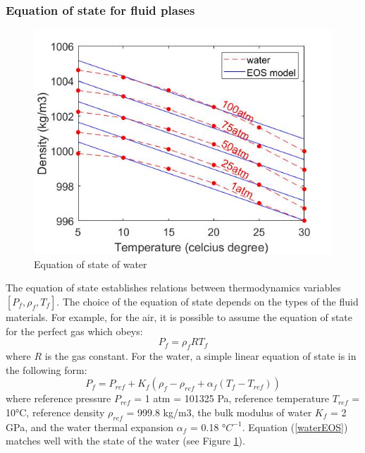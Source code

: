\documentclass[preprint,12pt]{elsarticle}
\begin{document}
\subsubsection{Equation of state for fluid plases}
%
%
\begin{figure}[H]
\center
\includegraphics[scale=.5]{water1.jpg}
\caption{Equation of state of water}
\label{fig:water1}
\end {figure}
%
%
The equation of state establishes relations between thermodynamics variables $[P_f, \rho_f, T_f]$. The choice of the equation of state depends on the types of the fluid materials. For example, for the air, it is possible to assume the equation of state for the perfect gas which obeys:
%
%
\begin{equation}
    P_f = \rho_f R T_f
\end {equation}
%
%
where $R$ is the gas constant. For the water, a simple linear equation of state is in the following form:
%
%
\begin{equation}
    P_f = P_{ref} + K_f (\rho_f - \rho_{ref} + \alpha_f(T_f - T_{ref}))
\label{waterEOS}
\end {equation}
%
%
where reference pressure $P_{ref}$ = 1 atm = 101325 Pa, reference temperature $T_{ref}$ = 10°C, reference density  $\rho_{ref}$ = 999.8 kg/m3, the bulk modulus of water $K_f$ = 2 GPa, and the water thermal expansion $\alpha_f$ = 0.18 °$C^{-1}$. Equation (\ref{waterEOS}) matches well with the state of the water (see Figure \ref{fig:water1}).

\end{document}
